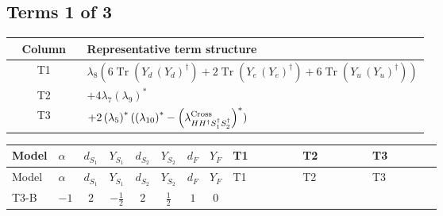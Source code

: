 \documentclass[8pt]{article}
\begin{document}
\begin{landscape}
\subsection*{Terms 1 of 3}
\begin{center}
\begin{tabular}{@{}c >{\raggedright\arraybackslash}p{0.82\linewidth}@{}}
\toprule
Column & Representative term structure \\
\midrule
T1 & \(\displaystyle {\lambda_8} (6 \operatorname{Tr}\!\left({Y_d}\,\left({Y_d}\right)^{\dagger}\right)+2 \operatorname{Tr}\!\left({Y_e}\,\left({Y_e}\right)^{\dagger}\right)+6 \operatorname{Tr}\!\left({Y_u}\,\left({Y_u}\right)^{\dagger}\right))\) \\
\midrule
T2 & \(\displaystyle +4 {\lambda_7} \left({\lambda_9}\right)^{*}\) \\
\midrule
T3 & \(\displaystyle +2 \left({\lambda_5}\right)^{*} (\left({\lambda_{10}}\right)^{*}-\left({\lambda_{H H^\dagger S_1^\dagger S_2^\dagger}^{\rm Cross}}\right)^{*})\) \\
\midrule
\bottomrule
\end{tabular}
\end{center}
\smallskip
\tiny
\begin{longtable}{@{}llcccccc >{\raggedright\arraybackslash}p{0.21\linewidth} >{\raggedright\arraybackslash}p{0.21\linewidth} >{\raggedright\arraybackslash}p{0.21\linewidth}@{}}
\toprule
Model & $\alpha$ & $d_{S_1}$ & $Y_{S_1}$ & $d_{S_2}$ & $Y_{S_2}$ & $d_F$ & $Y_F$ & T1 & T2 & T3 \\
\midrule
\endfirsthead
\toprule
Model & $\alpha$ & $d_{S_1}$ & $Y_{S_1}$ & $d_{S_2}$ & $Y_{S_2}$ & $d_F$ & $Y_F$ & T1 & T2 & T3 \\
\midrule
\endhead
T3-B & $-1$ & $2$ & $-\frac{1}{2}$ & $2$ & $\frac{1}{2}$ & $1$ & $0$ & \scriptsize\adjustbox{max width=\linewidth}{$\begin{gathered} {\lambda_8} (6 \operatorname{Tr}\!\left({Y_d}\,\left({Y_d}\right)^{\dagger}\right)+2 \operatorname{Tr}\!\left({Y_e}\,\left({Y_e}\right)^{\dagger}\right)+6 \operatorname{Tr}\!\left({Y_u}\,\left({Y_u}\right)^{\dagger}\right))\end{gathered}$} & \scriptsize\adjustbox{max width=\linewidth}{$\begin{gathered} +4 {\lambda_7} \left({\lambda_9}\right)^{*}\end{gathered}$} & \scriptsize\adjustbox{max width=\linewidth}{$\begin{gathered} +2 \left({\lambda_5}\right)^{*} (\left({\lambda_{10}}\right)^{*}-\left({\lambda_{H H^\dagger S_1^\dagger S_2^\dagger}^{\rm Cross}}\right)^{*})\end{gathered}$} \\

\end{longtable}
\end{landscape}
\end{document}
